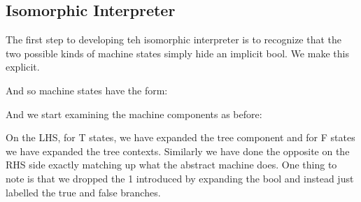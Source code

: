 \documentclass{llncs}
\begin{document}
\subsection{Isomorphic Interpreter}

The first step to developing teh isomorphic interpreter is to
recognize that the two possible kinds of machine states simply hide an
implicit {{bool}}. We make this explicit. 


And so machine states have the form:



And we start examining the machine components as before:

\begin{center}
\end{center}

On the LHS, for {{T}} states, we have expanded the tree component and
for {{F}} states we have expanded the tree contexts. Similarly we have
done the opposite on the RHS side exactly matching up what the
abstract machine does. One thing to note is that we dropped the {{1}}
introduced by expanding the {{bool}} and instead just labelled the
{{true}} and {{false}} branches.
\end{document}
